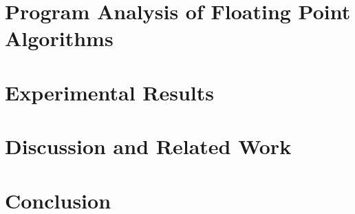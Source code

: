 \documentclass[12pt]{article}
\begin{document}
\section{Program Analysis of Floating Point Algorithms}


\section{Experimental Results}

\section{Discussion and Related Work}

\section{Conclusion}



\end{document}
